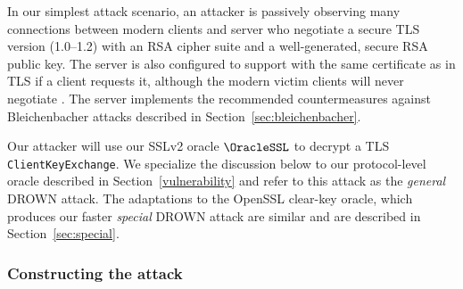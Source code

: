 In our simplest attack scenario, an attacker is passively observing many connections between modern clients and server who negotiate a secure TLS version (1.0--1.2) with an RSA cipher suite and a well-generated, secure RSA public key.   The server is also configured to support \ssltwo with the same certificate as in TLS if a client requests it, although the modern victim clients will never negotiate \ssltwo.  The server implements the recommended countermeasures against Bleichenbacher attacks described in Section~\ref{sec:bleichenbacher}.



Our attacker will use our SSLv2 oracle $\OracleSSL$ to decrypt a TLS \texttt{ClientKeyExchange}.  We specialize the discussion below to our protocol-level oracle described in Section~\ref{vulnerability} and refer to this attack as the \emph{general} DROWN attack.  The adaptations to the OpenSSL clear-key oracle, which produces our faster \emph{special} DROWN attack are similar and are described in Section~\ref{sec:special}.
\fi

\subsubsection{Constructing the attack}

